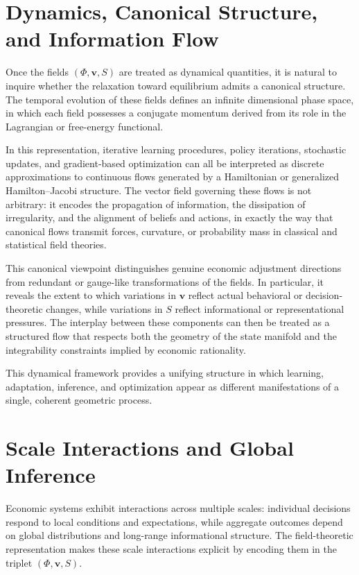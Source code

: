 \documentclass[12pt]{article}
\begin{document}
\section{Dynamics, Canonical Structure, and Information Flow}

Once the fields \((\Phi,\mathbf{v},S)\) are treated as dynamical quantities, it
is natural to inquire whether the relaxation toward equilibrium admits a
canonical structure.  The temporal evolution of these fields defines an infinite
dimensional phase space, in which each field possesses a conjugate momentum
derived from its role in the Lagrangian or free-energy functional.

In this representation, iterative learning procedures, policy iterations,
stochastic updates, and gradient-based optimization can all be interpreted as
discrete approximations to continuous flows generated by a Hamiltonian or
generalized Hamilton--Jacobi structure.  The vector field governing these flows
is not arbitrary: it encodes the propagation of information, the dissipation of
irregularity, and the alignment of beliefs and actions, in exactly the way that
canonical flows transmit forces, curvature, or probability mass in classical
and statistical field theories.

This canonical viewpoint distinguishes genuine economic adjustment directions
from redundant or gauge-like transformations of the fields.  In particular, it
reveals the extent to which variations in \(\mathbf{v}\) reflect actual
behavioral or decision-theoretic changes, while variations in \(S\) reflect
informational or representational pressures.  The interplay between these
components can then be treated as a structured flow that respects both the
geometry of the state manifold and the integrability constraints implied by
economic rationality.

This dynamical framework provides a unifying structure in which learning,
adaptation, inference, and optimization appear as different manifestations of a
single, coherent geometric process.

\section{Scale Interactions and Global Inference}

Economic systems exhibit interactions across multiple scales: individual
decisions respond to local conditions and expectations, while aggregate
outcomes depend on global distributions and long-range informational
structure.  The field-theoretic representation makes these scale interactions
explicit by encoding them in the triplet \((\Phi,\mathbf{v},S)\).
\end{document}
